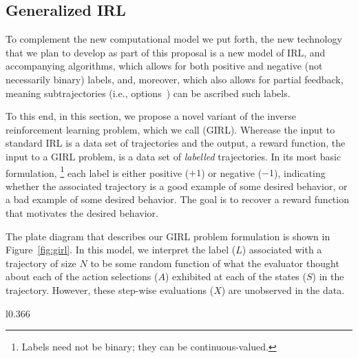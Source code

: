 
\subsection{Generalized IRL}
\label{sec:girl}

To complement the new computational model we put forth, the new
technology that we plan to develop as part of this proposal is a new
model of IRL, and accompanying algorithms, which allows for both
positive and negative (not necessarily binary) labels, and, moreover,
which also allows for partial feedback, meaning subtrajectories (i.e.,
options~\cite{sutton99}) can be ascribed such labels.

To this end, in this section, we propose a novel variant of the
inverse reinforcement learning problem, which we call
 (GIRL).  Wherease the input to standard IRL is
a data set of trajectories
and the output, a reward function, the input to a GIRL problem, is a
data set of \emph{labelled\/} trajectories. 
In its most basic formulation,%
\footnote{Labels need not be binary; they can be continuous-valued.}
each label is either positive ($+1$) or negative ($-1$), indicating
whether the associated trajectory is a good example of some desired
behavior, or a bad example of some desired behavior.  The goal is to
recover a reward function that motivates the desired behavior.

The plate diagram that describes our GIRL problem formulation is shown
in Figure~\ref{fig:girl}.  In this model, we interpret the label ($L$)
associated with a trajectory of size $N$ to be some random function of
what the evaluator thought about each of the action selections ($A$)
exhibited at each of the states ($S$) in the trajectory.  However,
these step-wise evaluations ($X$) are unobserved in the data.

\begin{wrapfigure}{l}{0.366\textwidth}
\caption{Generalized IRL}
\label{fig:girl}
\end{wrapfigure}

